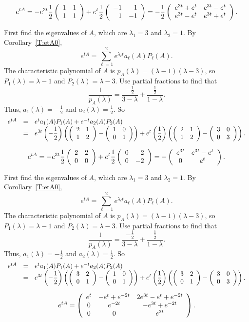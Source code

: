  \ans
\[
e^{tA} = -e^{3t}\frac{1}{2}\left(\begin{array}{rr} 1 & 1\\ 1 &1\end{array}\right) +
e^t\frac{1}{2}\left(\begin{array}{rr} -1 & 1\\ 1 &-1\end{array}\right)
= -\frac{1}{2}\left(\begin{array}{cc} e^{3t} + e^{t} & e^{3t} - e^{t}\\ e^{3t} - e^{t} &e^{3t} + e^{t}\end{array}\right).
\]

\soln First find the eigenvalues of $A$, which are $\lambda_1 = 3$ and
$\lambda_2 = 1$.  By Corollary~\ref{T:etA0},
\[
e^{tA} = \sum_{\ell = 1}^2 e^{\lambda_\ell t}a_\ell(A)P_\ell(A).
\]
The characteristic polynomial of $A$ is $p_A(\lambda) = (\lambda -
1)(\lambda - 3)$, so $P_1(\lambda) = \lambda - 1$ and $P_2(\lambda) =
\lambda - 3$.  Use partial fractions to find that
\[
\frac{1}{p_A(\lambda)} = \frac{-\frac{1}{2}}{3 - \lambda} + \frac{\frac{1}{2}}
{1 - \lambda}.
\]
Thus, $a_1(\lambda) = -\frac{1}{2}$ and $a_2(\lambda) = \frac{1}{2}$.  So
\[
\begin{array}{rcl}
e^{tA} & = & e^ta_1(A)P_1(A) + e^{-t}a_2(A)P_2(A) \\
& = & \displaystyle e^{3t}\left(-\frac{1}{2}\right)\left(\left(\begin{array}{rr} 2 & 1\\ 1 &2\end{array}\right) -
\left(\begin{array}{rr} 1 & 0\\ 0 &1\end{array}\right)\right) + e^{t}\left(\frac{1}{2}\right)
\left(\left(\begin{array}{rr} 2 & 1\\ 1 &2\end{array}\right) - \left(\begin{array}{rr} 3 & 0\\ 0 &3\end{array}\right)\right).
\end{array}
\]

 \ans
\[
e^{tA} = -e^{3t}\frac{1}{2}\left(\begin{array}{rr} 2 & 2\\ 0 &0\end{array}\right) +
e^t\frac{1}{2}\left(\begin{array}{rr} 0 & 2\\ 0 &-2\end{array}\right)
= -\left(\begin{array}{cc} e^{3t} & e^{3t} - e^{t}\\ 0 &e^{t}\end{array}\right).
\]

\soln First find the eigenvalues of $A$, which are $\lambda_1 = 3$ and
$\lambda_2 = 1$.  By Corollary~\ref{T:etA0},
\[
e^{tA} = \sum_{\ell = 1}^2 e^{\lambda_\ell t}a_\ell(A)P_\ell(A).
\]
The characteristic polynomial of $A$ is $p_A(\lambda) = (\lambda -
1)(\lambda - 3)$, so $P_1(\lambda) = \lambda - 1$ and $P_2(\lambda) =
\lambda - 3$.  Use partial fractions to find that
\[
\frac{1}{p_A(\lambda)} = \frac{-\frac{1}{2}}{3 - \lambda} + \frac{\frac{1}{2}}
{1 - \lambda}.
\]
Thus, $a_1(\lambda) = -\frac{1}{2}$ and $a_2(\lambda) = \frac{1}{2}$.  So
\[
\begin{array}{rcl}
e^{tA} & = & e^ta_1(A)P_1(A) + e^{-t}a_2(A)P_2(A) \\
& = & \displaystyle e^{3t}\left(-\frac{1}{2}\right)\left(\left(\begin{array}{rr} 3 & 2\\ 0 &1\end{array}\right) -
\left(\begin{array}{rr} 1 & 0\\ 0 &1\end{array}\right)\right) + e^{t}\left(\frac{1}{2}\right)
\left(\left(\begin{array}{rr} 3 & 2\\ 0 &1\end{array}\right) - \left(\begin{array}{rr} 3 & 0\\ 0 &3\end{array}\right)\right).
\end{array}
\]


 \ans
\[
e^{tA} =
\left(\begin{array}{ccc} e^t & -e^t + e^{-2t} & 2e^{3t} - e^t + e^{-2t} \\ 0 & e^{-2t} & -e^{3t} + e^{-2t} \\ 0 & 0 & e^{3t}\end{array}\right).
\]


